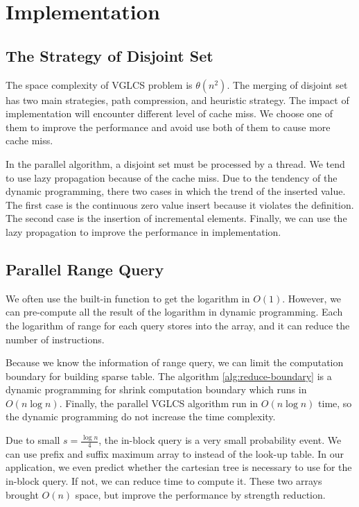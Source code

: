 \section{Implementation}
\label{sec:Implementation}

\subsection{The Strategy of Disjoint Set}

The space complexity of VGLCS problem is $\theta(n^2)$.  The merging
of disjoint set has two main strategies, path compression, and
heuristic strategy.  The impact of implementation will encounter
different level of cache miss.  We choose one of them to improve the
performance and avoid use both of them to cause more cache miss.

In the parallel algorithm, a disjoint set must be processed by a
thread.  We tend to use lazy propagation because of the cache miss.
Due to the tendency of the dynamic programming, there two cases in
which the trend of the inserted value.  The first case is the
continuous zero value insert because it violates the definition.  The
second case is the insertion of incremental elements.  Finally, we can
use the lazy propagation to improve the performance in implementation.

\subsection{Parallel Range Query}

We often use the built-in function to get the logarithm in $O(1)$.
However, we can pre-compute all the result of the logarithm in dynamic
programming.  Each the logarithm of range for each query stores into
the array, and it can reduce the number of instructions.

Because we know the information of range query, we can limit the
computation boundary for building sparse table.  The algorithm
\ref{alg:reduce-boundary} is a dynamic programming for shrink
computation boundary which runs in $O(n \log n)$.  Finally, the
parallel VGLCS algorithm run in $O(n \log n)$ time, so the dynamic
programming do not increase the time complexity.



Due to small $s = \frac{\log n}{4}$, the in-block query is a very
small probability event.  We can use prefix and suffix maximum array
to instead of the look-up table.  In our application, we even predict
whether the cartesian tree is necessary to use for the in-block query.
If not, we can reduce time to compute it.  These two arrays brought
$O(n)$ space, but improve the performance by strength reduction.

